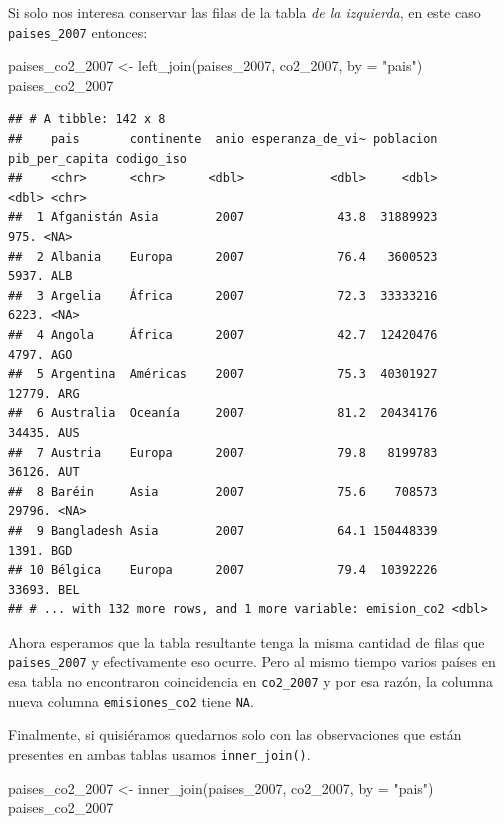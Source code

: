 \documentclass[
  openany]{book}
\newenvironment{Shaded}{\begin{snugshade}}{\end{snugshade}}
\newcommand{\AttributeTok}[1]{\textcolor[rgb]{0.77,0.63,0.00}{#1}}
\newcommand{\FunctionTok}[1]{\textcolor[rgb]{0.00,0.00,0.00}{#1}}
\newcommand{\NormalTok}[1]{#1}
\newcommand{\OtherTok}[1]{\textcolor[rgb]{0.56,0.35,0.01}{#1}}
\newcommand{\StringTok}[1]{\textcolor[rgb]{0.31,0.60,0.02}{#1}}
\begin{document}
Si solo nos interesa conservar las filas de la tabla \emph{de la izquierda}, en este caso \texttt{paises\_2007} entonces:

\begin{Shaded}
\begin{Highlighting}[]
\NormalTok{paises\_co2\_2007 }\OtherTok{\textless{}{-}} \FunctionTok{left\_join}\NormalTok{(paises\_2007, co2\_2007, }\AttributeTok{by =} \StringTok{"pais"}\NormalTok{)}
\NormalTok{paises\_co2\_2007}
\end{Highlighting}
\end{Shaded}

\begin{verbatim}
## # A tibble: 142 x 8
##    pais       continente  anio esperanza_de_vi~ poblacion pib_per_capita codigo_iso
##    <chr>      <chr>      <dbl>            <dbl>     <dbl>          <dbl> <chr>     
##  1 Afganistán Asia        2007             43.8  31889923           975. <NA>      
##  2 Albania    Europa      2007             76.4   3600523          5937. ALB       
##  3 Argelia    África      2007             72.3  33333216          6223. <NA>      
##  4 Angola     África      2007             42.7  12420476          4797. AGO       
##  5 Argentina  Américas    2007             75.3  40301927         12779. ARG       
##  6 Australia  Oceanía     2007             81.2  20434176         34435. AUS       
##  7 Austria    Europa      2007             79.8   8199783         36126. AUT       
##  8 Baréin     Asia        2007             75.6    708573         29796. <NA>      
##  9 Bangladesh Asia        2007             64.1 150448339          1391. BGD       
## 10 Bélgica    Europa      2007             79.4  10392226         33693. BEL       
## # ... with 132 more rows, and 1 more variable: emision_co2 <dbl>
\end{verbatim}

Ahora esperamos que la tabla resultante tenga la misma cantidad de filas que \texttt{paises\_2007} y efectivamente eso ocurre.
Pero al mismo tiempo varios países en esa tabla no encontraron coincidencia en \texttt{co2\_2007} y por esa razón, la columna nueva columna \texttt{emisiones\_co2} tiene \texttt{NA}.

Finalmente, si quisiéramos quedarnos solo con las observaciones que están presentes en ambas tablas usamos \texttt{inner\_join()}.

\begin{Shaded}
\begin{Highlighting}[]
\NormalTok{paises\_co2\_2007 }\OtherTok{\textless{}{-}} \FunctionTok{inner\_join}\NormalTok{(paises\_2007, co2\_2007, }\AttributeTok{by =} \StringTok{"pais"}\NormalTok{)}
\NormalTok{paises\_co2\_2007}
\end{Highlighting}
\end{Shaded}
\end{document}
